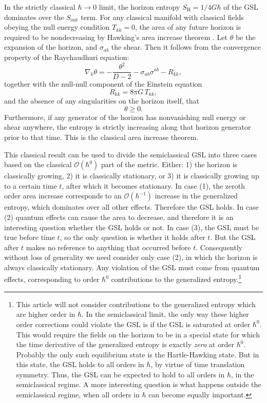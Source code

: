 \documentclass[12pt]{article}
\begin{document}
In the strictly classical $\hbar \to 0$ limit, the horizon entropy $S_\mathrm{H} = 1/{4G \hbar}$ of the GSL dominates over the $S_\mathrm{out}$ term.  For any classical manifold with classical fields obeying the null energy condition $T_{kk} = 0$, the area of any future horizon is required to be nondecreasing by Hawking's area increase theorem \cite{hawking71}.  Let $\theta$ be the expansion of the horizon, and $\sigma_{ab}$ the shear.  Then it follows from the convergence property of the Raychaudhuri equation:
\begin{equation}
\nabla_k \theta = -\frac{\theta^2}{D-2} - \sigma_{ab}\sigma^{ab} - R_{kk},
\end{equation}
together with the null-null component of the Einstein equation
\begin{equation}
R_{kk} = 8\pi G\,T_{kk},
\end{equation}
and the absence of any singularities on the horizon itself, that
\begin{equation}
\theta \ge 0.
\end{equation}
Furthermore, if any generator of the horizon has nonvanishing null energy or shear anywhere, the entropy is strictly increasing along that horizon generator prior to that time.  This is the classical area increase theorem.

This classical result can be used to divide the semiclassical GSL into three cases based on the classical $\mathcal{O}(\hbar^0)$ part of the metric.  Either: 1) the horizon is classically growing, 2) it is classically stationary, or 3) it is classically growing up to a certain time $t$, after which it becomes stationary.  In case (1), the zeroth order area increase corresponds to an $\mathcal{O}(\hbar^{-1})$ increase in the generalized entropy, which dominates over all other effects.  Therefore the GSL holds.  In case (2) quantum effects can cause the area to decrease, and therefore it is an interesting question whether the GSL holds or not.  In case (3), the GSL must be true before time $t$, so the only question is whether it holds after $t$.  But the GSL after $t$ makes no reference to anything that occurred before $t$.  Consequently without loss of generality we need consider only case (2), in which the horizon is always classically stationary.  Any violation of the GSL must come from quantum effects, corresponding to order $\hbar^{0}$ contributions to the generalized entropy.\footnote{This article will not consider contributions to the generalized entropy which are higher order in $\hbar$.  In the semiclassical limit, the only way these higher order corrections could violate the GSL is if the GSL is saturated at order $\hbar^0$.  This would require the fields on the horizon to be in a special state for which the time derivative of the generalized entropy is exactly \emph{zero} at order $\hbar^0$.  Probably the only such equilibrium state is the Hartle-Hawking state.  But in this state, the GSL holds to all orders in $\hbar$, by virtue of time translation symmetry.  Thus, the GSL can be expected to hold to all orders in $\hbar$, in the semiclassical regime.  A more interesting question is what happens outside the semiclassical regime, when all orders in $\hbar$ can become equally important.}
\end{document}
